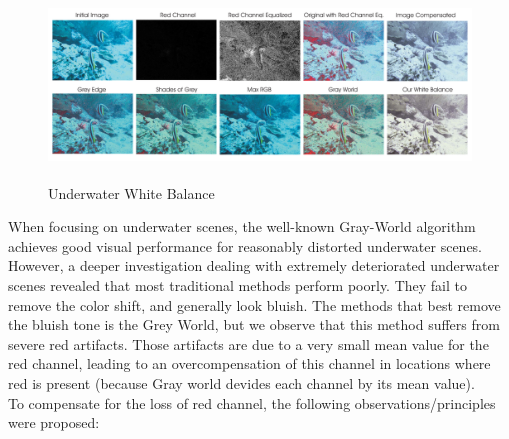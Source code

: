 \documentclass[hidelinks, 12pt]{report}
\begin{document}
\begin{figure}[H]
\centering
\includegraphics[width=15cm,height=5cm]{White.png}
\caption[Underwater White Balance]{Underwater White Balance}
\label{Balance}
\end{figure}
When focusing on underwater scenes, the well-known Gray-World algorithm achieves good visual performance for reasonably distorted underwater scenes. However, a deeper investigation dealing with extremely deteriorated underwater scenes revealed that most traditional methods perform poorly. They fail to remove the color shift, and generally look bluish. The methods that best remove the bluish tone is the Grey World, but we observe that this method suffers from severe red artifacts. Those artifacts are due to a very small mean value for the red channel, leading to an overcompensation of this channel in locations where red is present (because Gray world devides each channel by its mean value).\\
To compensate for the loss of red channel, the following observations/principles were proposed:
\end{document}

